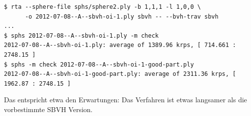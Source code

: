\documentclass[a4paper,11pt]{article}
\begin{document}
{\small\begin{verbatim}
$ rta --sphere-file sphs/sphere2.ply -b 1,1,1 -l 1,0,0 \
      -o 2012-07-08--A--sbvh-oi-1.ply sbvh -- --bvh-trav sbvh
...
$ sphs 2012-07-08--A--sbvh-oi-1.ply -m check
2012-07-08--A--sbvh-oi-1.ply: average of 1389.96 krps, [ 714.661 : 2748.15 ]
$ sphs -m check 2012-07-08--A--sbvh-oi-1-good-part.ply 
2012-07-08--A--sbvh-oi-1-good-part.ply: average of 2311.36 krps, [ 1962.87 : 2748.15 ]
\end{verbatim}}

Das entspricht etwa den Erwartungen: Das Verfahren ist etwas langsamer als die vorbestimmte SBVH Version.
\end{document}
